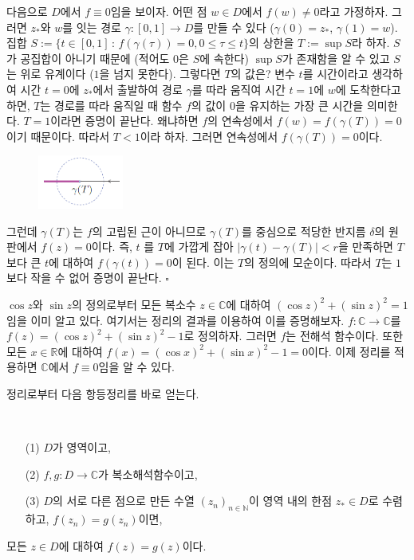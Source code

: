 다음으로 $D$에서 $f\equiv 0$임을 보이자.
어떤 점 $w\in D$에서 $f(w)\ne0$라고 가정하자.
그러면 $z_*$와 $w$를 잇는 경로 $\gamma :[0,1] \to D$를 만들 수 있다
($\gamma(0)=z_*$, $\gamma(1)=w$).
집합 $S:=\{t\in[0,1]\,:\, f(\gamma(\tau))=0, 0\le \tau \le t \}$의
상한을 $T:=\sup S$라 하자. $S$가 공집합이 아니기 때문에 (적어도 $0$은 $S$에 속한다)
$\sup S$가 존재함을 알 수 있고
$S$는 위로 유계이다 ($1$을 넘지 못한다). 
그렇다면 $T$의 값은? 변수 $t$를 시간이라고 생각하여
시간 $t=0$에 $z_*$에서 출발하여 경로 $\gamma$를 따라 움직여
시간 $t=1$에 $w$에 도착한다고 하면,
$T$는 경로를 따라 움직일 때 함수 $f$의 값이 $0$을 유지하는 가장 큰 시간을 의미한다.
$T=1$이라면 증명이 끝난다. 왜냐하면 $f$의 연속성에서 $f(w)=f(\gamma(T))=0$이기 때문이다.
따라서 $T<1$이라 하자.
그러면 연속성에서 $f(\gamma(T))=0$이다. 
\begin{figure}[h!]
\begin{center}
\includegraphics[width=0.25\textwidth]{./SaltChapter/fig-4-0-6}
\end{center}
\end{figure}

그런데 $\gamma(T)$는 $f$의 고립된 근이 아니므로
$\gamma(T)$를 중심으로 적당한 반지름 $\delta$의 원판에서
 $f(z)=0$이다. 즉, 
 $t$ 를 $T$에 가깝게 잡아 $|\gamma(t) - \gamma(T)|<r$을 만족하면
 $T$보다 큰 $t$에 대하여 $f(\gamma(t))=0$이 된다.
이는 $T$의 정의에 모순이다. 따라서 $T$는 $1$보다 작을 수 없어 증명이 끝난다.
\hfill $\square$

\begin{saltexample}[label=example-4-7]{}{}
$\cos z$와 $\sin z$의 정의로부터 모든 복소수 $z\in \mathbb C$에 대하여
$(\cos z)^2 + (\sin z)^2 = 1$임을 이미 알고 있다.
여기서는 정리의 결과를 이용하여 이를 증명해보자.
$f:\mathbb C \to \mathbb C$를 $f(z) = (\cos z)^2 + (\sin z)^2 - 1$로
정의하자. 그러면 $f$는 전해석 함수이다. 또한
모든 $x\in \mathbb R$에 대하여 $ f(x) = (\cos x)^2 + (\sin x)^2 - 1 = 0$이다.
이제 정리를 적용하면 $\mathbb C$에서 $f\equiv 0$임을 알 수 있다.
\end{saltexample}

정리로부터 다음 항등정리를 바로 얻는다.

\begin{salt_corollary}  \label{coro-4-6}
\
\begin{itemize}
\item[(1)] $D$가 영역이고,
\item[(2)] $f,g:D\to\mathbb C$가 복소해석함수이고,
\item[(3)] $D$의 서로 다른 점으로 만든 수열 $(z_n)_{n\in\mathbb N}$이 
영역 내의 한점 $z_*\in D$로 수렴하고,
$f(z_n) = g(z_n)$이면,
\end{itemize}
모든 $z\in D$에 대하여 $f(z) = g(z)$이다.
\end{salt_corollary}

